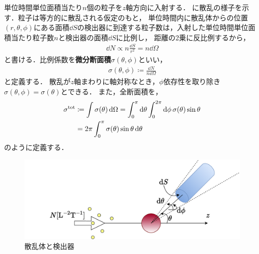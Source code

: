 \documentclass{report}
\begin{document}
  単位時間単位面積当たり$n$個の粒子を$z$軸方向に入射する．
  に散乱の様子を示す．粒子は等方的に散乱される仮定のもと，
  単位時間内に散乱体からの位置$(r,\theta,\phi)$にある面積$\dd{S}$の検出器に到達する粒子数は，入射した単位時間単位面積当たり粒子数$n$と検出器の面積$\dd{S}$に比例し，
  距離の2乗に反比例するから，
  \begin{align}
    \dd{N} \propto n \frac{\dd{S}}{r^2} = n\dd{\Omega}
  \end{align}
  と書ける．比例係数を\textbf{微分断面積}$\sigma (\theta, \phi)$といい，
  \begin{align}
    \sigma(\theta, \phi) \coloneqq \frac{\dd{N}}{n \dd{\Omega}}\label{differential-cross-section-def}
  \end{align}
  と定義する．
  散乱が$z$軸まわりに軸対称なとき，$\phi$依存性を取り除き$\sigma(\theta, \phi) = \sigma (\theta)$とできる．
  また，全断面積を，
  \begin{align}
    \sigma^{\mathrm{tot}} &\coloneqq \int \sigma(\theta) \dd{\Omega} = \int_{0}^{\pi}\dd{\theta}\int_{0}^{2\pi}\dd{\phi}\sigma(\theta) \sin\theta \\ 
    &= 2\pi \int_{0}^{\pi} \sigma(\theta) \sin \theta \dd{\theta}\label{total-area}
  \end{align}
  のように定義する．
  \begin{figure}[H]
    \centering
    \includegraphics[width = 0.6\columnwidth]{fig/scattering_diagram.pdf}
    \caption{散乱体と検出器}\label{scattering_detection}
  \end{figure}
\end{document}
